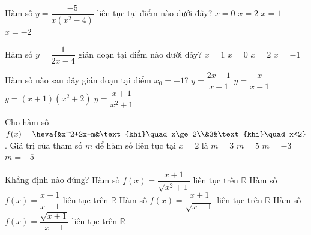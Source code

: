 \begin{ex}%
	Hàm  số $y=\dfrac{-5}{x\left( x^2-4 \right)}$ liên tục tại điểm nào dưới đây?
	\choice 
		{$x=0$} 
		 {$x=2$}
		{\True $x=1$} 
		 {$x=-2$}
\end{ex}

\begin{ex}%
	Hàm số $y=\dfrac{1}{2x-4}$ gián đoạn tại điểm  nào dưới đây?
	\choice 
		 {$x=1$}
		{$x=0$} 
		{\True  $x=2$}
		 {$x=-1$}
\end{ex}

\begin{ex}%
	Hàm  số nào sau đây gián đoạn tại điểm $x_0=-1$?
	\choice 
		{\True $y=\dfrac{2x-1}{x+1}$} 
		{$y=\dfrac{x}{x-1}$} 
		{$y=(x+1)(x^2+2)$} 
		{$y=\dfrac{x+1}{x^2+1}$} 
\end{ex}

\begin{ex}%
	Cho hàm số $f(x)=\heva{&x^2+2x+m&\text{khi}\quad x\ge 2\\&3&\text{khi}\quad x<2}$. Giá trị của tham số $m$ để hàm số liên tục  tại $x=2$ là
	\choice 
		{$m=3$} 
		 {$m=5$}
		 {$m=-3$}
		{\True $m=-5$} 
\end{ex}

\begin{ex}%
	Khẳng  định nào đúng?
	 \choice
		{\True Hàm số $f(x)=\dfrac{x+1}{\sqrt{x^2+1}}$  liên tục trên $\mathbb{R}$}
		{Hàm số  $f(x)=\dfrac{x+1}{x-1}$ liên tục trên $\mathbb{R}$}
		{Hàm số  $f(x)=\dfrac{x+1}{\sqrt{x-1}}$ liên tục trên $\mathbb{R}$}
		{Hàm số $f(x)=\dfrac{\sqrt{x+1}}{x-1}$ liên  tục trên $\mathbb{R}$}
\end{ex}

